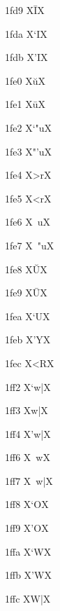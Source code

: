 \documentclass[11pt]{article}
\begin{document}
1fd9 X{\textgreek{\={I}}}X

1fda X{\textgreek{`I}}X

1fdb X{\textgreek{'I}}X

1fe0 X{\textgreek{\u{u}}}X

1fe1 X{\textgreek{\={u}}}X

1fe2 X{\textgreek{`"u}}X

1fe3 X{\textgreek{"'u}}X

1fe4 X{\textgreek{>r}}X

1fe5 X{\textgreek{<r}}X

1fe6 X{\textgreek{~u}}X

1fe7 X{\textgreek{~"u}}X

1fe8 X{\textgreek{\u{U}}}X

1fe9 X{\textgreek{\={U}}}X

1fea X{\textgreek{`U}}X

1feb X{\textgreek{'Y}}X

1fec X{\textgreek{<R}}X

1ff2 X{\textgreek{`w|}}X

1ff3 X{\textgreek{w|}}X

1ff4 X{\textgreek{'w|}}X

1ff6 X{\textgreek{~w}}X

1ff7 X{\textgreek{~w|}}X

1ff8 X{\textgreek{`O}}X

1ff9 X{\textgreek{'O}}X

1ffa X{\textgreek{`W}}X

1ffb X{\textgreek{'W}}X

1ffc X{\textgreek{W|}}X
\end{document}
